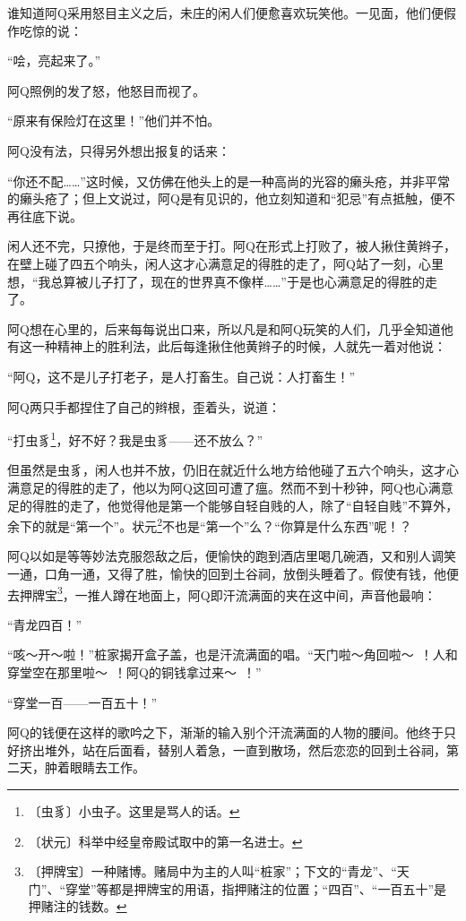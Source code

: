 \documentclass[12pt,UTF-8,openany]{ctexbook}
\begin{document}
\begin{large}
    谁知道阿Q采用怒目主义之后，未庄的闲人们便愈喜欢玩笑他。一见面，他们便假作吃惊的说：
    
    “哙，亮起来了。”
    
    阿Q照例的发了怒，他怒目而视了。
    
    “原来有保险灯在这里！”他们并不怕。
    
    阿Q没有法，只得另外想出报复的话来：
    
    “你还不配……”这时候，又仿佛在他头上的是一种高尚的光容的癞头疮，并非平常的癞头疮了；但上文说过，阿Q是有见识的，他立刻知道和“犯忌”有点抵触，便不再往底下说。
    
    闲人还不完，只撩他，于是终而至于打。阿Q在形式上打败了，被人揪住黄辫子，在壁上碰了四五个响头，闲人这才心满意足的得胜的走了，阿Q站了一刻，心里想，“我总算被儿子打了，现在的世界真不像样……”于是也心满意足的得胜的走了。
    
    阿Q想在心里的，后来每每说出口来，所以凡是和阿Q玩笑的人们，几乎全知道他有这一种精神上的胜利法，此后每逢揪住他黄辫子的时候，人就先一着对他说：
    
    “阿Q，这不是儿子打老子，是人打畜生。自己说：人打畜生！”
    
    阿Q两只手都捏住了自己的辫根，歪着头，说道：
    
    “打虫豸\footnote{〔虫豸〕小虫子。这里是骂人的话。}，好不好？我是虫豸——还不放么？”
    
    但虽然是虫豸，闲人也并不放，仍旧在就近什么地方给他碰了五六个响头，这才心满意足的得胜的走了，他以为阿Q这回可遭了瘟。然而不到十秒钟，阿Q也心满意足的得胜的走了，他觉得他是第一个能够自轻自贱的人，除了“自轻自贱”不算外，余下的就是“第一个”。状元\footnote{〔状元〕科举中经皇帝殿试取中的第一名进士。}不也是“第一个”么？“你算是什么东西”呢！？
    
    阿Q以如是等等妙法克服怨敌之后，便愉快的跑到酒店里喝几碗酒，又和别人调笑一通，口角一通，又得了胜，愉快的回到土谷祠，放倒头睡着了。假使有钱，他便去押牌宝\footnote{〔押牌宝〕一种赌博。赌局中为主的人叫“桩家”；下文的“青龙”、“天门”、“穿堂”等都是押牌宝的用语，指押赌注的位置；“四百”、“一百五十”是押赌注的钱数。}，一推人蹲在地面上，阿Q即汗流满面的夹在这中间，声音他最响：
    
    “青龙四百！”
    
    “咳～开～啦！”桩家揭开盒子盖，也是汗流满面的唱。“天门啦～角回啦～~！人和穿堂空在那里啦～~！阿Q的铜钱拿过来～~！”
    
    “穿堂一百——一百五十！”
    
    阿Q的钱便在这样的歌吟之下，渐渐的输入别个汗流满面的人物的腰间。他终于只好挤出堆外，站在后面看，替别人着急，一直到散场，然后恋恋的回到土谷祠，第二天，肿着眼睛去工作。
    

\end{large}
\end{document}
